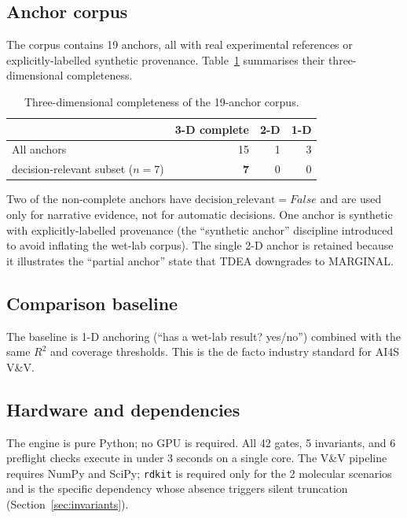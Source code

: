 \documentclass[review,3p]{elsarticle}
\begin{document}
\subsection{Anchor corpus}
\label{sec:anchors}

The corpus contains 19 anchors, all with real experimental references or explicitly-labelled synthetic provenance. Table~\ref{tab:anchor-dist} summarises their three-dimensional completeness.

\begin{table}[h]
    \centering
    \caption{Three-dimensional completeness of the 19-anchor corpus.}
    \label{tab:anchor-dist}
    \begin{tabular}{lrrr}
        \toprule
        & 3-D complete & 2-D & 1-D \\
        \midrule
        All anchors & 15 & 1 & 3 \\
        decision-relevant subset ($n{=}7$) & \textbf{7} & 0 & 0 \\
        \bottomrule
    \end{tabular}
\end{table}

Two of the non-complete anchors have $\text{decision\_relevant}=False$ and are used only for narrative evidence, not for automatic decisions. One anchor is synthetic with explicitly-labelled provenance (the ``synthetic anchor'' discipline introduced to avoid inflating the wet-lab corpus). The single 2-D anchor is retained because it illustrates the ``partial anchor'' state that TDEA downgrades to MARGINAL.

\subsection{Comparison baseline}
\label{sec:baseline}

The baseline is 1-D anchoring (``has a wet-lab result? yes/no'') combined with the same $R^2$ and coverage thresholds. This is the de facto industry standard for AI4S V\&V.

\subsection{Hardware and dependencies}
\label{sec:hw}

The engine is pure Python; no GPU is required. All 42 gates, 5 invariants, and 6 preflight checks execute in under 3 seconds on a single core. The V\&V pipeline requires NumPy and SciPy; \texttt{rdkit} is required only for the 2 molecular scenarios and is the specific dependency whose absence triggers silent truncation (Section~\ref{sec:invariants}).
\end{document}
